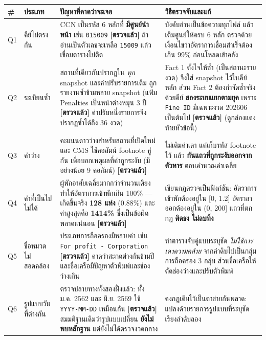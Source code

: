 \documentclass[11pt,a4paper]{article}
\newcommand{\sansall}{\sffamily}
\newcommand{\code}[1]{\texttt{#1}}
\newcommand{\ok}{\textcolor{dw}{\textbf{[ตรวจแล้ว]}}}
\begin{document}
\begin{table}[H]\centering
\begin{adjustbox}{max width=\linewidth}
\small
\begin{tabular}{L{0.8cm} L{3.0cm} L{6.2cm} L{6.4cm}}
\toprule
\sansall\bfseries \# & \sansall\bfseries ประเภท &
\sansall\bfseries ปัญหาที่คาดว่าจะเจอ & \sansall\bfseries วิธีตรวจจับและแก้ \\
\midrule
Q1 & คีย์ไม่ตรงกัน &
  CCN เป็นรหัส 6 หลักที่ \textbf{มีศูนย์นำหน้า} เช่น \code{015009} \ok{}
  ถ้าอ่านเป็นตัวเลขจะเหลือ \code{15009} แล้วเชื่อมตารางไม่ติด &
  บังคับอ่านเป็นข้อความทุกไฟล์ แล้วเติมศูนย์ให้ครบ 6 หลัก
  ตรวจด้วยเงื่อนไขว่าอัตราการเชื่อมสำเร็จต้องเกิน 99\% ก่อนโหลดเข้าคลัง \\
\addlinespace
Q2 & ระเบียนซ้ำ &
  สถานที่เดียวกันปรากฏใน \emph{ทุก} snapshot และค่าปรับรายการเดิม
  ถูกรายงานซ้ำข้ามหลาย snapshot (แฟ้ม Penalties เป็นหน้าต่างหมุน 3 ปี \ok{}
  ค่าปรับหนึ่งรายการจึงปรากฏซ้ำได้ถึง 36 งวด) &
  Fact 1 ตั้งใจให้ซ้ำ (เป็นสถานะรายงวด) จึงใส่ snapshot ไว้ในคีย์หลัก
  ส่วน Fact 2 ต้องกำจัดซ้ำจริง ด้วยคีย์ \textbf{สองระบบแยกตามยุค}
  เพราะ \code{Fine ID} มีเฉพาะงวด 202606 เป็นต้นไป \ok{}
  (ดูกล่องแดงท้ายหัวข้อนี้) \\
\addlinespace
Q3 & ค่าว่าง &
  คะแนนดาวว่างสำหรับสถานที่เปิดใหม่ และ CMS ใช้คอลัมน์ footnote คู่กัน
  เพื่อบอกเหตุผลที่ค่าถูกระงับ (มีอย่างน้อย 9 คอลัมน์) \ok{} &
  ไม่เติมค่าเดา แต่เก็บรหัส footnote ไว้ แล้ว
  \textbf{กันแถวที่ถูกระงับออกจากตัวหาร} ตอนคำนวณค่าเฉลี่ย \\
\addlinespace
Q4 & ค่าที่เป็นไปไม่ได้ &
  ผู้พักอาศัยเฉลี่ยมากกว่าจำนวนเตียง ทำให้อัตราการเข้าพักเกิน 100\%
  --- เกิดขึ้นจริง \textbf{128 แห่ง} (0.88\%) และค่าสูงสุดคือ
  \textbf{1414\%} ซึ่งเป็นข้อผิดพลาดแน่นอน \ok{} &
  เขียนกฎตรวจเป็นฟังก์ชัน: อัตราการเข้าพักต้องอยู่ใน [0, 1.2]
  อัตราลาออกต้องอยู่ใน (0, 200] แถวที่ตกกฎ \textbf{ติดธง ไม่ลบทิ้ง} \\
\addlinespace
Q5 & ชื่อหมวดไม่สอดคล้อง &
  ประเภทการถือครองมีหลายค่า เช่น \code{For profit - Corporation} \ok{}
  คาดว่าสะกดต่างกันข้ามปี และชื่อเครือมีปัญหาตัวพิมพ์และช่องว่างเกิน &
  ทำตารางจับคู่แบบระบุชัด \emph{ไม่ใช้การเดาความคล้าย}
  จากค่าดิบไปเป็นกลุ่มการถือครอง 3 กลุ่ม ส่วนชื่อเครือให้ตัดช่องว่างและปรับตัวพิมพ์ \\
\addlinespace
Q6 & รูปแบบวันที่ต่างกัน &
  ตรวจปลายทางทั้งสองฝั่งแล้ว: ทั้ง ม.ค. 2562 และ มิ.ย. 2569 ใช้
  \code{YYYY-MM-DD} เหมือนกัน \ok{} สมมติฐานเดิมว่ารูปแบบเปลี่ยน
  \textbf{ยังไม่พบหลักฐาน} แต่ยังไม่ได้ตรวจงวดกลาง &
  คงกฎเดิมไว้เป็นตาข่ายกันพลาด: แปลงด้วยรายการรูปแบบที่ระบุชัดเรียงลำดับลอง

\end{tabular}
\end{adjustbox}
\end{table}
\end{document}

